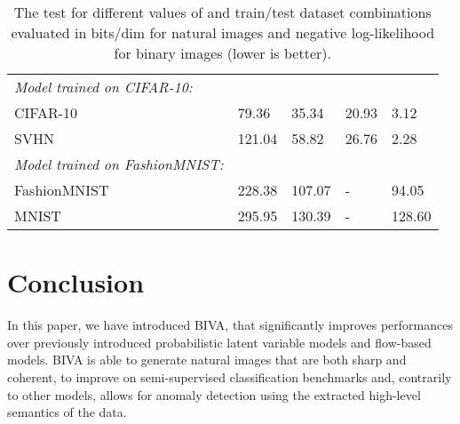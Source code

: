 \documentclass{article}
\def\nm{BIVA\xspace}
\begin{document}
\begin{table}[t]
  \begin{minipage}[c]{0.75\textwidth}
\begin{small}
\begin{sc}

\begin{tabular}{l l l l l}
&  &  &  & \\
\hline
\textit{Model trained on CIFAR-10:} \\
CIFAR-10 & 79.36 & 35.34 & 20.93 & 3.12\\
SVHN & 121.04 & 58.82 & 26.76 & 2.28 \\
\textit{Model trained on FashionMNIST:} \\
FashionMNIST & 228.38 & 107.07 & - & 94.05 \\
MNIST & 295.95 & 130.39 & - & 128.60 \\
\hline
\end{tabular}
\end{sc}
\end{small}
\end{minipage}\hfill
  \begin{minipage}[c]{0.25\textwidth}
\caption{The test  for different values of  and train/test dataset combinations evaluated in bits/dim for natural images and negative log-likelihood for binary images (lower is better).}\label{table:anomaly}
  \end{minipage}
  \vspace*{-0.6cm}
\end{table}

\section{Conclusion}
In this paper, we have introduced \nm, that significantly improves performances over previously introduced probabilistic latent variable models and flow-based models. \nm is able to generate natural images that are both sharp and coherent, to improve on semi-supervised classification benchmarks and, contrarily to other models, allows for anomaly detection using the extracted high-level semantics of the data. 







\newpage
\iffalse
\section*{Acknowledgements} 
...
\fi
\small


\normalsize
\end{document}
